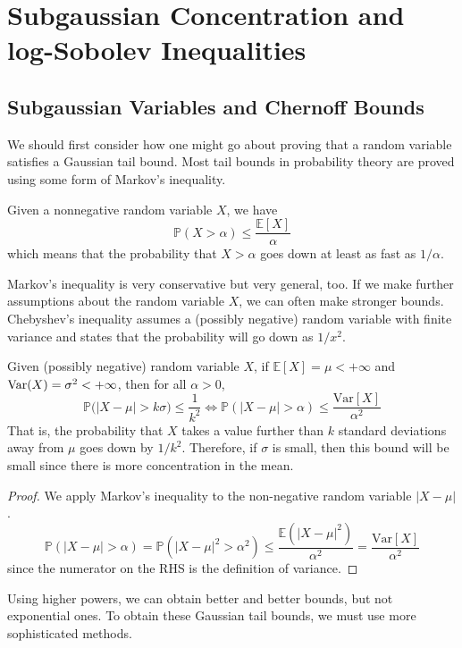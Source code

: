 \section{Subgaussian Concentration and log-Sobolev Inequalities}

\subsection{Subgaussian Variables and Chernoff Bounds}
  
  We should first consider how one might go about proving that a random variable satisfies a Gaussian tail bound. Most tail bounds in probability theory are proved using some form of Markov's inequality. 
  \begin{lemma}
  Given a nonnegative random variable $X$, we have 
  \[\mathbb{P}(X > \alpha) \leq \frac{\mathbb{E}[X]}{\alpha}\]
  which means that the probability that $X > \alpha$ goes down at least as fast as $1/\alpha$. 
  \end{lemma}

  Markov's inequality is very conservative but very general, too. If we make further assumptions about the random variable $X$, we can often make stronger bounds. Chebyshev's inequality assumes a (possibly negative) random variable with finite variance and states that the probability will go down as $1/x^2$. 

  \begin{theorem}
  Given (possibly negative) random variable $X$, if $\mathbb{E}[X] = \mu < +\infty$ and $\Var(X) = \sigma^2 < +\infty$, then for all $\alpha > 0$, 
  \[\mathbb{P} \big( |X - \mu| > k \sigma \big) \leq \frac{1}{k^2} \iff \mathbb{P}(|X - \mu| > \alpha) \leq \frac{\mathrm{Var}[X]}{\alpha^2}\]
  That is, the probability that $X$ takes a value further than $k$ standard deviations away from $\mu$ goes down by $1/k^2$. Therefore, if $\sigma$ is small, then this bound will be small since there is more concentration in the mean. 
  \end{theorem}
  \begin{proof}
  We apply Markov's inequality to the non-negative random variable $|X - \mu|$. 
  \[\mathbb{P}(|X - \mu| > \alpha) = \mathbb{P}(|X - \mu|^2 > \alpha^2) \leq \frac{\mathbb{E}(|X - \mu|^2)}{\alpha^2} = \frac{\mathrm{Var}[X]}{\alpha^2}\]
  since the numerator on the RHS is the definition of variance. 
  \end{proof}

  Using higher powers, we can obtain better and better bounds, but not exponential ones. To obtain these Gaussian tail bounds, we must use more sophisticated methods. 

